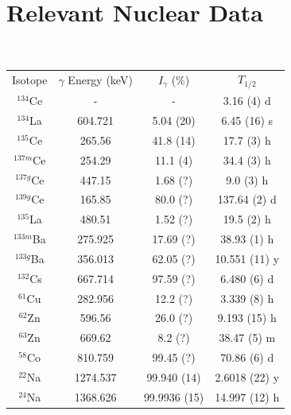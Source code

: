 \documentclass[aps,twocolumn,secnumarabic,balancelastpage,amsmath,amssymb,nofootinbib,floatfix]{revtex4-1}
\begin{document}
\section{Relevant Nuclear Data \cite{ensdf}}
\label{nudat_appendix}
\ \ 
\begin{ruledtabular}
\begin{tabular}{cccc}
Isotope & $\gamma$ Energy (keV) & $I_{\gamma}$ (\%) & $T_{1/2}$ \\
$^{134}$Ce & - & - & 3.16 (4) d \\
$^{134}$La & 604.721 & 5.04 (20) & 6.45 (16) s \\
$^{135}$Ce & 265.56 & 41.8 (14) & 17.7 (3) h \\
$^{137m}$Ce & 254.29 & 11.1 (4) & 34.4 (3) h \\
$^{137g}$Ce & 447.15 & 1.68 (?) & 9.0 (3) h \\
$^{139g}$Ce & 165.85 & 80.0 (?) & 137.64 (2) d \\
$^{135}$La & 480.51 & 1.52 (?) & 19.5 (2) h \\
$^{133m}$Ba & 275.925 & 17.69 (?) & 38.93 (1) h \\
$^{133g}$Ba & 356.013 & 62.05 (?) & 10.551 (11) y \\
$^{132}$Cs & 667.714 & 97.59 (?) & 6.480 (6) d \\
$^{61}$Cu & 282.956 & 12.2 (?) & 3.339 (8) h \\
$^{62}$Zn & 596.56 & 26.0 (?) & 9.193 (15) h \\
$^{63}$Zn & 669.62 & 8.2 (?) & 38.47 (5) m \\
$^{58}$Co & 810.759 & 99.45 (?) & 70.86 (6) d \\
$^{22}$Na & 1274.537 & 99.940 (14) & 2.6018 (22) y \\
$^{24}$Na & 1368.626 & 99.9936 (15) & 14.997 (12) h \\
\end{tabular}
\label{table:stack}
\end{ruledtabular}
\ \ 
\end{document}
